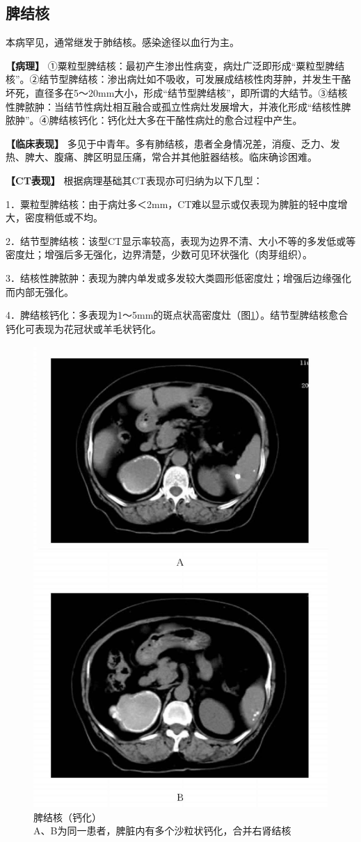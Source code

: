 \subsection{脾结核}

本病罕见，通常继发于肺结核。感染途径以血行为主。

\textbf{【病理】}
①粟粒型脾结核：最初产生渗出性病变，病灶广泛即形成“粟粒型脾结核”。②结节型脾结核：渗出病灶如不吸收，可发展成结核性肉芽肿，并发生干酪坏死，直径多在5～20mm大小，形成“结节型脾结核”，即所谓的大结节。③结核性脾脓肿：当结节性病灶相互融合或孤立性病灶发展增大，并液化形成“结核性脾脓肿”。④脾结核钙化：钙化灶大多在干酪性病灶的愈合过程中产生。

\textbf{【临床表现】}
多见于中青年。多有肺结核，患者全身情况差，消瘦、乏力、发热、脾大、腹痛、脾区明显压痛，常合并其他脏器结核。临床确诊困难。

\textbf{【CT表现】} 根据病理基础其CT表现亦可归纳为以下几型：

1．粟粒型脾结核：由于病灶多＜2mm，CT难以显示或仅表现为脾脏的轻中度增大，密度稍低或不均。

2．结节型脾结核：该型CT显示率较高，表现为边界不清、大小不等的多发低或等密度灶；增强后多无强化，边界清楚，少数可见环状强化（肉芽组织）。

3．结核性脾脓肿：表现为脾内单发或多发较大类圆形低密度灶；增强后边缘强化而内部无强化。

4．脾结核钙化：多表现为1～5mm的斑点状高密度灶（图\ref{fig14-4}）。结节型脾结核愈合钙化可表现为花冠状或羊毛状钙化。

\begin{figure}[!htbp]
 \centering
 \includegraphics[width=.7\textwidth,height=\textheight,keepaspectratio]{./images/Image00312.jpg}
 \captionsetup{justification=centering}
 \caption{脾结核（钙化）\\{\small A、B为同一患者，脾脏内有多个沙粒状钙化，合并右肾结核}}
 \label{fig14-4}
  \end{figure} 

